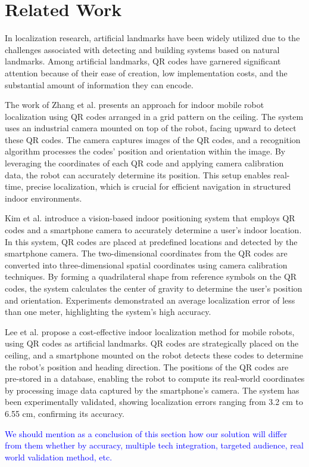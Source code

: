 \section{Related Work}

In localization research, artificial landmarks have been widely utilized due to the challenges associated with detecting and building systems based on natural landmarks. Among artificial landmarks, QR codes have garnered significant attention because of their ease of creation, low implementation costs, and the substantial amount of information they can encode.

The work of Zhang et al. \cite{zhang2015} presents an approach for indoor mobile robot localization using QR codes arranged in a grid pattern on the ceiling. The system uses an industrial camera mounted on top of the robot, facing upward to detect these QR codes. The camera captures images of the QR codes, and a recognition algorithm processes the codes' position and orientation within the image. By leveraging the coordinates of each QR code and applying camera calibration data, the robot can accurately determine its position. This setup enables real-time, precise localization, which is crucial for efficient navigation in structured indoor environments.

Kim et al. \cite{kim2021} introduce a vision-based indoor positioning system that employs QR codes and a smartphone camera to accurately determine a user's indoor location. In this system, QR codes are placed at predefined locations and detected by the smartphone camera. The two-dimensional coordinates from the QR codes are converted into three-dimensional spatial coordinates using camera calibration techniques. By forming a quadrilateral shape from reference symbols on the QR codes, the system calculates the center of gravity to determine the user's position and orientation. Experiments demonstrated an average localization error of less than one meter, highlighting the system's high accuracy.

Lee et al. \cite{lee2015} propose a cost-effective indoor localization method for mobile robots, using QR codes as artificial landmarks. QR codes are strategically placed on the ceiling, and a smartphone mounted on the robot detects these codes to determine the robot’s position and heading direction. The positions of the QR codes are pre-stored in a database, enabling the robot to compute its real-world coordinates by processing image data captured by the smartphone's camera. The system has been experimentally validated, showing localization errors ranging from 3.2 cm to 6.55 cm, confirming its accuracy.

\textcolor{blue}{We should mention as a conclusion of this section how our solution will differ from them whether by accuracy, multiple tech integration, targeted audience, real world validation method, etc.}